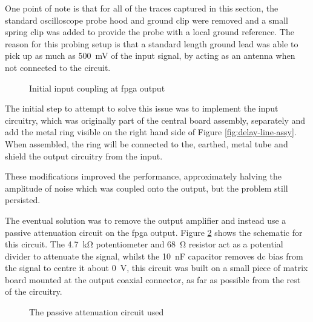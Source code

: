 One point of note is that for all of the traces captured in this section, the standard oscilloscope probe hood and ground clip were removed and a small spring clip was added to provide the probe with a local ground reference. The reason for this probing setup is that a standard length ground lead was able to pick up as much as \SI{500}{\milli\volt} of the input signal, by acting as an antenna when not connected to the circuit.

\begin{figure}[ht]
	\centering
	\caption{Initial input coupling at \gls{fpga} output}
	\label{fig:fpga-initial-input-couping}
\end{figure}

The initial step to attempt to solve this issue was to implement the input circuitry, which was originally part of the central board assembly, separately and add the metal ring visible on the right hand side of Figure \ref{fig:delay-line-assy}. When assembled, the ring will be connected to the, earthed, metal tube and shield the output circuitry from the input.

These modifications improved the performance, approximately halving the amplitude of noise which was coupled onto the output, but the problem still persisted.

The eventual solution was to remove the output amplifier and instead use a passive attenuation circuit on the \gls{fpga} output. Figure \ref{fig:output-passive-attenuator} shows the schematic for this circuit. The \SI{4.7}{\kilo\ohm} potentiometer and \SI{68}{\ohm} resistor act as a potential divider to attenuate the signal, whilst the \SI{10}{\nano\farad} capacitor removes \gls{dc} bias from the signal to centre it about \SI{0}{\volt}, this circuit was built on a small piece of matrix board mounted at the output coaxial connector, as far as possible from the rest of the circuitry.

\begin{figure}[ht]
	\centering
	\caption{The passive attenuation circuit used}
	\label{fig:output-passive-attenuator}
\end{figure}

